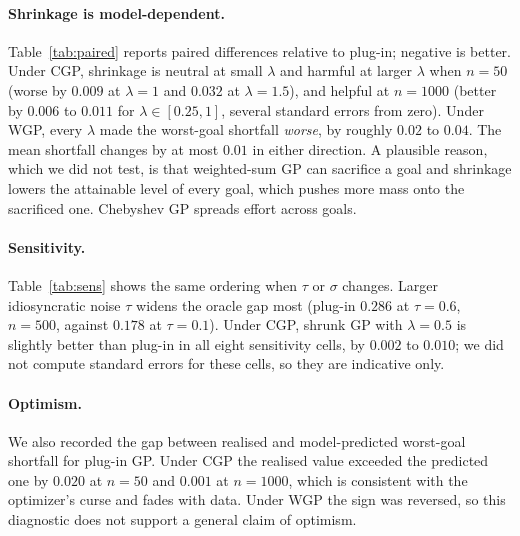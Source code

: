 \documentclass[11pt,a4paper]{article}
\begin{document}
\paragraph{Shrinkage is model-dependent.} Table~\ref{tab:paired} reports paired differences relative to plug-in; negative is better. Under CGP, shrinkage is neutral at small $\lambda$ and harmful at larger $\lambda$ when $n=50$ (worse by $0.009$ at $\lambda=1$ and $0.032$ at $\lambda=1.5$), and helpful at $n=1000$ (better by $0.006$ to $0.011$ for $\lambda\in[0.25,1]$, several standard errors from zero). Under WGP, every $\lambda$ made the worst-goal shortfall \emph{worse}, by roughly $0.02$ to $0.04$. The mean shortfall changes by at most $0.01$ in either direction. A plausible reason, which we did not test, is that weighted-sum GP can sacrifice a goal and shrinkage lowers the attainable level of every goal, which pushes more mass onto the sacrificed one. Chebyshev GP spreads effort across goals.

\begin{table}[t]\centering\small
\caption{Paired change in worst-goal shortfall relative to plug-in (standard error in parentheses). Negative values favour shrinkage.}\label{tab:paired}\end{table}
\begin{table}[t]\centering\small
\caption{Sensitivity to unit-level noise $\tau$ and measurement noise $\sigma$ under CGP (100 replications). Worst-goal shortfall.}\label{tab:sens}\end{table}

\paragraph{Sensitivity.} Table~\ref{tab:sens} shows the same ordering when $\tau$ or $\sigma$ changes. Larger idiosyncratic noise $\tau$ widens the oracle gap most (plug-in $0.286$ at $\tau=0.6$, $n=500$, against $0.178$ at $\tau=0.1$). Under CGP, shrunk GP with $\lambda=0.5$ is slightly better than plug-in in all eight sensitivity cells, by $0.002$ to $0.010$; we did not compute standard errors for these cells, so they are indicative only.

\paragraph{Optimism.} We also recorded the gap between realised and model-predicted worst-goal shortfall for plug-in GP. Under CGP the realised value exceeded the predicted one by $0.020$ at $n=50$ and $0.001$ at $n=1000$, which is consistent with the optimizer's curse and fades with data. Under WGP the sign was reversed, so this diagnostic does not support a general claim of optimism.
\end{document}
